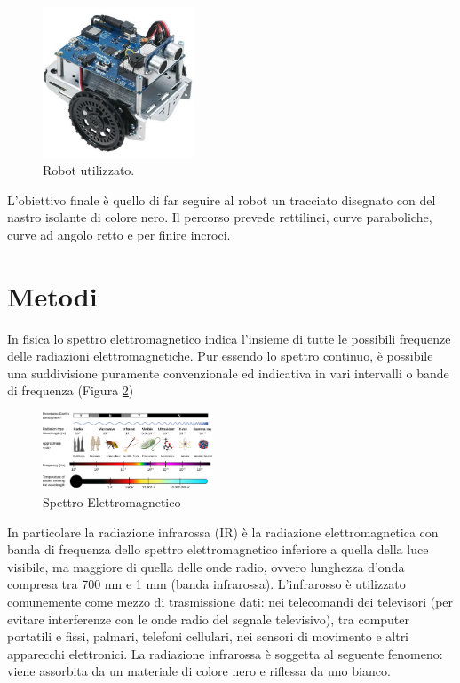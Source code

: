 \documentclass[twoside,twocolumn]{article}
\begin{document}
\begin{figure}[h]
	\centering
	\includegraphics[width=0.4\textwidth]{immagini/robot}
	\caption{Robot utilizzato.}
	\label{fig:robot}
\end{figure}

L'obiettivo finale è quello di far seguire al robot un tracciato disegnato con del nastro isolante di colore nero. Il percorso prevede rettilinei, curve paraboliche, curve ad angolo retto e per finire incroci.

\section{Metodi}

In fisica lo spettro elettromagnetico indica l'insieme di tutte le possibili frequenze delle radiazioni elettromagnetiche. Pur essendo lo spettro continuo, è possibile una suddivisione puramente convenzionale ed indicativa in vari intervalli o bande di frequenza (Figura \ref{fig:spettro})

\begin{figure}[h]
	\centering
	\includegraphics[width=0.45\textwidth]{immagini/spettro}
	\caption{Spettro Elettromagnetico}
	\label{fig:spettro}
\end{figure}

In particolare la radiazione infrarossa (IR) è la radiazione elettromagnetica con banda di frequenza dello spettro elettromagnetico inferiore a quella della luce visibile, ma maggiore di quella delle onde radio, ovvero lunghezza d'onda compresa tra 700 nm e 1 mm (banda infrarossa).
L'infrarosso è utilizzato comunemente come mezzo di trasmissione dati: nei telecomandi dei televisori (per evitare interferenze con le onde radio del segnale televisivo), tra computer portatili e fissi, palmari, telefoni cellulari, nei sensori di movimento e altri apparecchi elettronici. La radiazione infrarossa è soggetta al seguente fenomeno: viene assorbita da un materiale di colore nero e riflessa da uno bianco. 
\end{document}

